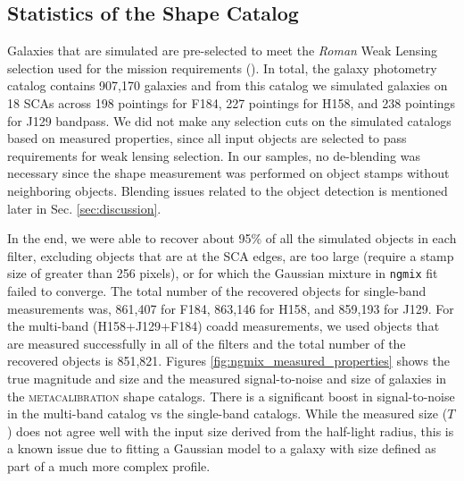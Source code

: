 \documentclass[fleqn,usenatbib]{mnras}
\begin{document}
\subsection{Statistics of the Shape Catalog}
Galaxies that are simulated are pre-selected to meet the \emph{Roman} Weak Lensing selection used for the mission requirements (\citealt{2018arXiv180403628D, 2021MNRAS.501.2044T}). In total, the galaxy photometry catalog contains 907,170 galaxies and from this catalog we simulated galaxies on 18 SCAs across 198 pointings for F184, 227 pointings for H158, and 238 pointings for J129 bandpass. We did not make any selection cuts on the simulated catalogs based on measured properties, since all input objects are selected to pass requirements for weak lensing selection. In our samples, no de-blending was necessary since the shape measurement was performed on object stamps without neighboring objects. Blending issues related to the object detection is mentioned later in Sec. \ref{sec:discussion}. 

In the end, we were able to recover about 95\% of all the simulated objects in each filter, excluding objects that are at the SCA edges, are too large (require a stamp size of greater than 256 pixels), or for which the Gaussian mixture in \texttt{ngmix} fit failed to converge. The total number of the recovered objects for single-band measurements was, 861,407 for F184, 863,146 for H158, and 859,193 for J129. For the multi-band (H158+J129+F184) coadd measurements, we used objects that are measured successfully in all of the filters and the total number of the recovered objects is 851,821.
Figures \ref{fig:ngmix_measured_properties} shows the true magnitude and size and the measured signal-to-noise and size of galaxies in the \textsc{metacalibration} shape catalogs. There is a significant boost in signal-to-noise in the multi-band catalog vs the single-band catalogs. While the measured size ($T$) does not agree well with the input size derived from the half-light radius, this is a known issue due to fitting a Gaussian model to a galaxy with size defined as part of a much more complex profile.

\end{document}
